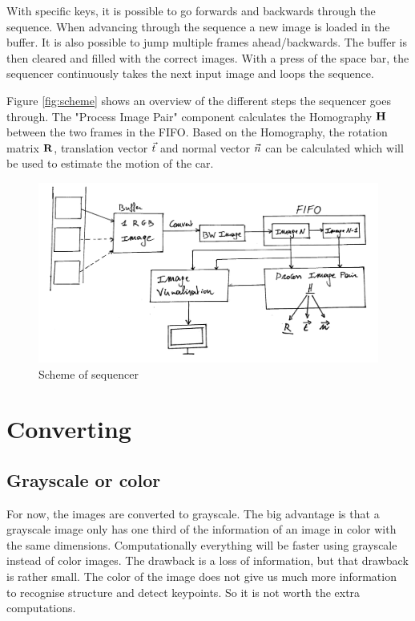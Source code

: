 With specific keys, it is possible to go forwards and backwards through the sequence. When advancing through the sequence a new image is loaded in the buffer. It is also possible to jump multiple frames ahead/backwards. The buffer is then cleared and filled with the correct images. With a press of the space bar, the sequencer continuously takes the next input image and loops the sequence.\bigskip

Figure \autoref{fig:scheme} shows an overview of the different steps the sequencer goes through. The "Process Image Pair" component calculates the Homography $\mathbf{H}$ between the two frames in the FIFO. Based on the Homography, the rotation matrix $\mathbf{R}$, translation vector $\vec t$ and normal vector $\vec n$ can be calculated which will be used to estimate the motion of the car.

\begin{figure}
    \centering
    \includegraphics[width=1\textwidth]{figures/Block_diagram_sequencer.jpg}
    \caption{Scheme of sequencer}
    \label{fig:scheme}
\end{figure}

\section{Converting}
\subsection{Grayscale or color}
For now, the images are converted to grayscale. The big advantage is that a grayscale image only has one third of the information of an image in color with the same dimensions. Computationally everything will be faster using grayscale instead of color images. The drawback is a loss of information, but that drawback is rather small. The color of the image does not give us much more information to recognise structure and detect keypoints. So it is not worth the extra computations.\bigskip

